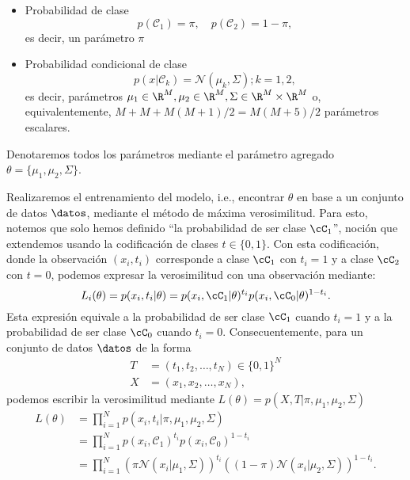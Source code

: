 \begin{itemize}
	\item Probabilidad de clase
	\begin{equation}
	 	p(\mathcal{C}_1)=\pi,\quad  p(\mathcal{C}_2)=1-\pi,\label{eq:prob_clase}
	 \end{equation}  es decir,  un parámetro $\pi$
	\item Probabilidad condicional de clase 
	\begin{equation}
		p(x|\mathcal{C}_k) = \mathcal{N}(\mu_k,  \Sigma); k=1,2,\label{eq:prob_clase_cond}
	\end{equation} 
	es decir, parámetros $ \mu_1\in\R^M,\mu_2\in\R^M,\Sigma\in\R^M\times\R^M$ o, equivalentemente, $M + M + M(M+1)/2=M(M+5)/2$ parámetros escalares. 
\end{itemize}
Denotaremos todos los parámetros mediante el parámetro agregado $\theta =\{\mu_1,\mu_2,\Sigma \}$.

Realizaremos el entrenamiento del modelo, i.e., encontrar $\theta$ en base a un conjunto de datos $\datos$, mediante el método de máxima verosimilitud. Para esto, notemos que solo hemos definido ``la probabilidad de ser clase $\cC_1$'', noción que extendemos usando la codificación de clases $t\in\{0,1\}$.  Con esta codificación, donde la observación $(x_i,t_i)$ corresponde a clase $\cC_1$ con $t_i = 1$ y a clase $\cC_2$ con  $t=0$, podemos expresar la verosimilitud con una observación mediante:
\begin{equation}
	L_i(\theta) = p(x_i, t_i|\theta) =  p(x_i,\cC_1|\theta)^{t_i}p(x_i,\cC_0|\theta)^{1-t_i}. 
\end{equation}
Esta expresión equivale a la probabilidad de ser clase $\cC_1$ cuando $t_i=1$ y a la probabilidad de ser clase $\cC_0$ cuando $t_i=0$. Consecuentemente, para un conjunto de datos $\datos$ de la forma
	\begin{align}
	T&=(t_1,t_2,\ldots,t_N) \in \{0,1\}^N\\
	X&=(x_1,x_2,\ldots,x_N),
	\end{align}
podemos escribir la verosimilitud mediante $L(\theta) = p(X,T|\pi,\mu_1,\mu_2,\Sigma) $
\begin{align}
	L(\theta) &= \prod_{i=1}^{N}p(x_i,t_i|\pi,\mu_1,\mu_2,\Sigma)\nonumber\\
	&= \prod_{i=1}^{N}p(x_i,\mathcal{C}_1)^{t_i}p(x_i,\mathcal{C}_0)^{1-t_i}\nonumber\\
	&= \prod_{i=1}^{N}(\pi\mathcal{N}(x_i|\mu_1,\Sigma))^{t_i}
	((1-\pi)\mathcal{N}(x_i|\mu_2,\Sigma))^{1-t_i}.
	\end{align}


